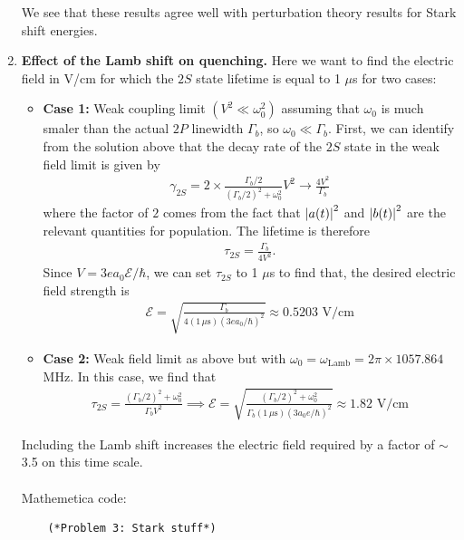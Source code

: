 \documentclass{article}
\theoremstyle{definition}
\newcommand{\f}[2]{\frac{#1}{#2}}
\begin{document}
\begin{enumerate}[label=(\alph*)]
	
	We see that these results agree well with perturbation theory results for Stark shift energies. 
	
	
	
	
	\item \textbf{Effect of the Lamb shift on quenching.}  Here we want to find the electric field in V/cm for which the $2S$ state lifetime is equal to 1 $\mu$s for two cases: 
	\begin{itemize}
		\item \textbf{Case 1:} Weak coupling limit $(V^2\ll \omega_0^2)$ assuming that $\omega_0$ is much smaler than the actual $2P$ linewidth $\Gamma_b$, so $\omega_0 \ll \Gamma_b$. First, we can identify from the solution above that the decay rate of the $2S$ state in the weak field limit is given by 
		\begin{align*}
		\gamma_{2S} = 2\times \f{  \Gamma_b/2}{(\Gamma_b/2)^2+\omega_0^2} V^2 \to \f{4V^2}{\Gamma_b}
		\end{align*}
		where the factor of $2$ comes from the fact that $\abs{a(t)}^2$ and $\abs{b(t)}^2$ are the relevant quantities for population. The lifetime is therefore
		\begin{align*}
		\tau_{2S} = \f{\Gamma_b}{4V^2}.
		\end{align*}
		Since $V = 3 e a_0 \mathcal{E}/\hbar$, we can set $\tau_{2S}$ to 1 $\mu$s to find that, the desired electric field strength is 
		\begin{align*}
		\mathcal{E} = \sqrt{\f{\Gamma_b}{4 (1\,\mu \text{s})(3ea_0/\hbar)^2 }} \approx \boxed{0.5203 \text{ V/cm}}
		\end{align*}
	
		
		
		\item \textbf{Case 2:} Weak field limit as above but with $\omega_0  = \omega_\text{Lamb} = 2\pi \times 1057.864 $ MHz. In this case, we find that
		\begin{align*}
		\tau_{2S} = \f{(\Gamma_b/2)^2 + \omega_0^2}{\Gamma_b V^2} \implies \mathcal{E} = \sqrt{ \f{(\Gamma_b/2)^2 + \omega_0^2}{\Gamma_b (1 \, \mu\text{s}) (3a_0 e /\hbar)^2}   } \approx \boxed{1.82 \text{ V/cm}} 
		\end{align*}
	\end{itemize}	
	Including the Lamb shift increases the electric field required by a factor of $\sim$3.5 on this time scale. \\
	
	
	$\,$\\
	
	Mathemetica code:
	\begin{lstlisting}
	(*Problem 3: Stark stuff*)
	

\end{lstlisting}
\end{enumerate}
\end{document}
